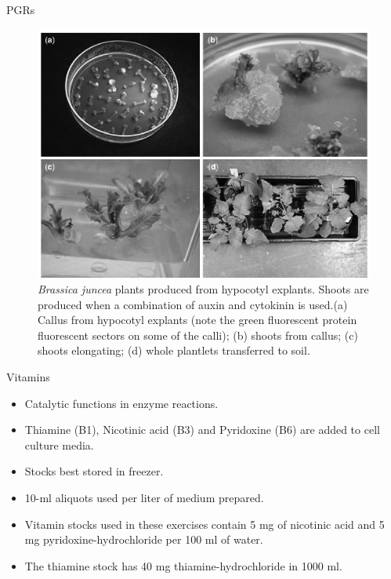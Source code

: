 \documentclass[ignorenonframetext,aspectratio=169]{beamer}
\providecommand{\tightlist}{%
  \setlength{\itemsep}{0pt}\setlength{\parskip}{0pt}}
\begin{document}
\begin{frame}{PGRs}
\protect\hypertarget{pgrs-3}{}

\begin{figure}
\includegraphics[width=0.45\linewidth]{../images/stages_of_tc} \caption{\textit{Brassica juncea} plants produced from hypocotyl explants. Shoots are produced when a combination of auxin and cytokinin is used.\newline (a) Callus from hypocotyl explants (note the green fluorescent protein fluorescent sectors on some of the calli); (b) shoots from callus; (c) shoots elongating; (d) whole plantlets transferred to soil.}\label{fig:stages-of-tc}
\end{figure}

\end{frame}

\begin{frame}{Vitamins}
\protect\hypertarget{vitamins}{}

\begin{itemize}
\tightlist
\item
  Catalytic functions in enzyme reactions.
\item
  Thiamine (B1), Nicotinic acid (B3) and Pyridoxine (B6) are added to
  cell culture media.
\item
  Stocks best stored in freezer.
\item
  10-ml aliquots used per liter of medium prepared.
\item
  Vitamin stocks used in these exercises contain 5 mg of nicotinic acid
  and 5 mg pyridoxine-hydrochloride per 100 ml of water.
\item
  The thiamine stock has 40 mg thiamine-hydrochloride in 1000 ml.
\end{itemize}

\end{frame}
\end{document}
